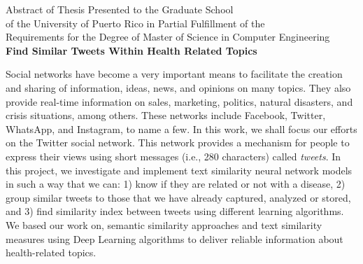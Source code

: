 \documentclass[12pt]{report}
\begin{document}
	\begin{center}
		\doublespacing
		Abstract of Thesis Presented to the Graduate School\\
		of the University of Puerto Rico in Partial Fulfillment of the\\
		Requirements for the Degree of Master of Science in Computer Engineering\\
		\vspace{.1cm}
		\large\textbf {Find Similar Tweets Within Health Related Topics}
	\end{center}
	\doublespacing
Social networks have become a very important means to facilitate the creation and sharing of information, ideas, news, and opinions on many topics.  They also provide real-time information on sales, marketing, politics, natural disasters, and crisis situations, among others. These networks include Facebook, Twitter, WhatsApp, and Instagram, to name a few. In this work, we shall focus our efforts on the Twitter social network. This network provides a mechanism for people to express their views using short messages (i.e., 280 characters)
	called {\em tweets}. In this project, we investigate and implement text similarity neural network models in such a way that we can: 1) know if they are related or not with a disease, 2) group similar tweets to those that we have already captured, analyzed or stored, and 3) find similarity index between tweets using different learning algorithms. We based our work on, semantic similarity approaches and text similarity measures using Deep Learning algorithms to deliver reliable information about health-related topics.

	\par
	\clearpage
	
\end{document}
